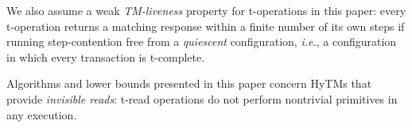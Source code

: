 We also assume a weak \emph{TM-liveness} property for t-operations in this paper: every t-operation returns a matching
response within a finite number of its own steps if running step-contention free from a \emph{quiescent} configuration,
\emph{i.e.}, a configuration in which every transaction is t-complete.

Algorithms and lower bounds presented in this paper concern HyTMs that provide \emph{invisible reads}: t-read operations do not perform
nontrivial primitives in any execution.
%
%
% 	 
%
